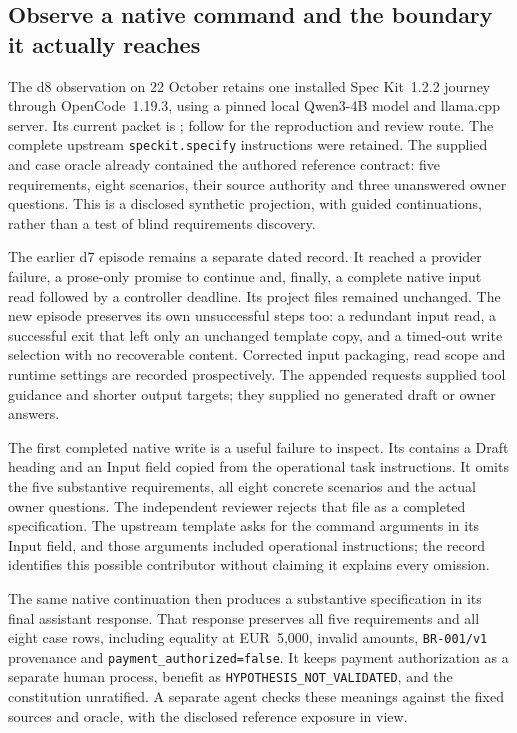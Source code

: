\subsection{Observe a native command and the boundary it actually reaches}\label{sec:ch4-native-observation}

The d8 observation on 22 October retains one installed Spec Kit~1.2.2 journey through OpenCode~1.19.3, using a pinned local Qwen3-4B model and llama.cpp server. Its current packet is ; follow  for the reproduction and review route. The complete upstream \texttt{speckit.specify} instructions were retained. The supplied  and case oracle already contained the authored reference contract: five requirements, eight scenarios, their source authority and three unanswered owner questions. This is a disclosed synthetic projection, with guided continuations, rather than a test of blind requirements discovery.

The earlier d7 episode remains a separate dated record. It reached a provider failure, a prose-only promise to continue and, finally, a complete native input read followed by a controller deadline. Its project files remained unchanged. The new episode preserves its own unsuccessful steps too: a redundant input read, a successful exit that left only an unchanged template copy, and a timed-out write selection with no recoverable content. Corrected input packaging, read scope and runtime settings are recorded prospectively. The appended requests supplied tool guidance and shorter output targets; they supplied no generated draft or owner answers.

The first completed native write is a useful failure to inspect. Its  contains a Draft heading and an Input field copied from the operational task instructions. It omits the five substantive requirements, all eight concrete scenarios and the actual owner questions. The independent reviewer rejects that file as a completed specification. The upstream template asks for the command arguments in its Input field, and those arguments included operational instructions; the record identifies this possible contributor without claiming it explains every omission.

The same native continuation then produces a substantive specification in its final assistant response. That response preserves all five requirements and all eight case rows, including equality at EUR~5,000, invalid amounts, \texttt{BR-001/v1} provenance and \texttt{payment\_authorized=false}. It keeps payment authorization as a separate human process, benefit as \nolinkurl{HYPOTHESIS\_NOT\_VALIDATED}, and the constitution unratified. A separate agent checks these meanings against the fixed sources and oracle, with the disclosed reference exposure in view.

